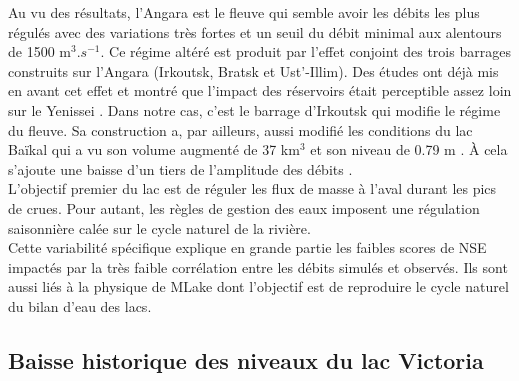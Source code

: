 Au vu des résultats, l'Angara est le fleuve qui semble avoir les débits les plus régulés avec des variations très fortes et un seuil du débit minimal aux alentours de 1500 m$^{3}.s^{-1}$. Ce régime altéré est produit par l'effet conjoint des trois barrages construits sur l'Angara (Irkoutsk, Bratsk et Ust'-Illim). Des études ont déjà mis en avant cet effet et montré que l'impact des réservoirs était perceptible assez loin sur le Yenissei \citep{adam2007}. Dans notre cas, c'est le barrage d'Irkoutsk qui modifie le régime du fleuve. Sa construction a, par ailleurs, aussi modifié les conditions du lac Baïkal qui a vu son volume augmenté de 37 km$^{3}$ et son niveau de 0.79 m \citep{sinyukovich2019}. À cela s'ajoute une baisse d'un tiers de l'amplitude des débits \citep{vyruchalkina2004}.\\  
L'objectif premier du lac est de réguler les flux de masse à l'aval durant les pics de crues. Pour autant, les règles de gestion des eaux imposent une régulation saisonnière calée sur le cycle naturel de la rivière.\\
Cette variabilité spécifique explique en grande partie les faibles scores de NSE impactés par la très faible corrélation entre les débits simulés et observés. Ils sont aussi liés à la physique de MLake dont l'objectif est de reproduire le cycle naturel du bilan d'eau des lacs. 

\subsection{{\selectfont Baisse historique des niveaux du lac Victoria}}

